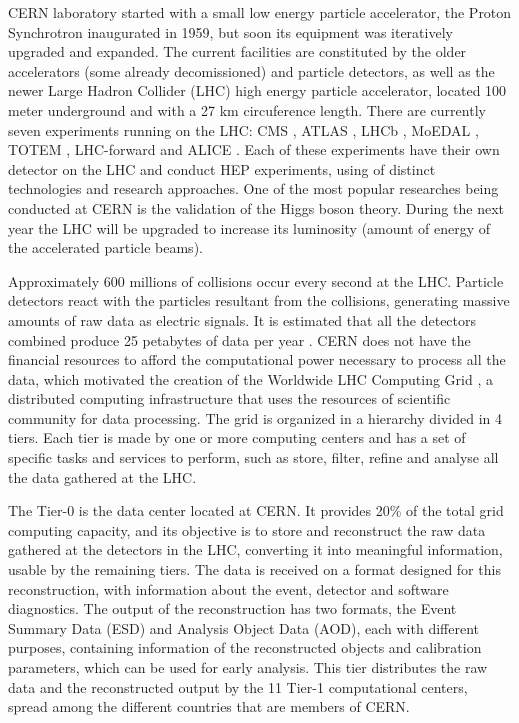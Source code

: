 CERN laboratory started with a small low energy particle accelerator, the Proton Synchrotron \cite{CERN:PS} inaugurated in 1959, but soon its equipment was iteratively upgraded and expanded. The current facilities are constituted by the older accelerators (some already decomissioned) and particle detectors, as well as the newer Large Hadron Collider (LHC) \cite{CERN:LHC} high energy particle accelerator, located 100 meter underground and with a 27 km circuference length. There are currently seven experiments running on the LHC: CMS \cite{CERN:CMS}, ATLAS \cite{CERN:ATLAS}, LHCb \cite{CERN:LHCb}, MoEDAL \cite{CERN:MoEDAL}, TOTEM \cite{CERN:TOTEM}, LHC-forward \cite{CERN:LHCf} and ALICE \cite{CERN:ALICE}. Each of these experiments have their own detector on the LHC and conduct HEP experiments, using of distinct technologies and research approaches. One of the most popular researches being conducted at CERN is the validation of the Higgs boson theory. During the next year the LHC will be upgraded to increase its luminosity (amount of energy of the accelerated particle beams).

Approximately 600 millions of collisions occur every second at the LHC. Particle detectors react with the particles resultant from the collisions, generating massive amounts of raw data as electric signals. It is estimated that all the detectors combined produce 25 petabytes of data per year \cite{CERN:DATA1,CERN:DATA2}. CERN does not have the financial resources to afford the computational power necessary to process all the data, which motivated the creation of the Worldwide LHC Computing Grid \cite{CERN:WLHCCG}, a distributed computing infrastructure that uses the resources of scientific community for data processing. The grid is organized in a hierarchy divided in 4 tiers. Each tier is made by one or more computing centers and has a set of specific tasks and services to perform, such as store, filter, refine and analyse all the data gathered at the LHC.

The Tier-0 is the data center located at CERN. It provides 20\% of the total grid computing capacity, and its objective is to store and reconstruct the raw data gathered at the detectors in the LHC, converting it into meaningful information, usable by the remaining tiers. The data is received on a format designed for this reconstruction, with information about the event, detector and software diagnostics. The output of the reconstruction has two formats, the Event Summary Data (ESD) and Analysis Object Data (AOD), each with different purposes, containing information of the reconstructed objects and calibration parameters, which can be used for early analysis. This tier distributes the raw data and the reconstructed output by the 11 Tier-1 computational centers, spread among the different countries that are members of CERN.

